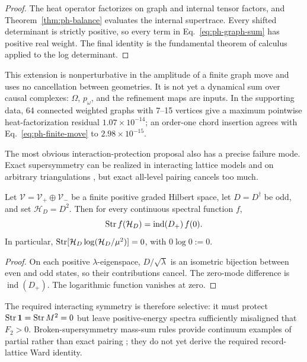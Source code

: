 \begin{proof}
The heat operator factorizes on graph and internal tensor factors, and
Theorem~\ref{thm:ph-balance} evaluates the internal supertrace.  Every
shifted determinant is strictly positive, so every term in
Eq.~\eqref{eq:ph-graph-sum} has positive real weight.  The final identity
is the fundamental theorem of calculus applied to the log determinant.
\end{proof}

This extension is nonperturbative in the amplitude of a finite graph move
and uses no cancellation between geometries.  It is not yet a dynamical
sum over causal complexes: \(\Omega\), \(p_\omega\), and the refinement maps
are inputs.  In the supporting data, 64 connected weighted graphs with
7--15 vertices give a maximum pointwise heat-factorization residual
\(1.07\times10^{-14}\); an order-one chord insertion agrees with
Eq.~\eqref{eq:ph-finite-move} to \(2.98\times10^{-15}\).

The most obvious interaction-protection proposal also has a precise
failure mode.  Exact supersymmetry can be realized in interacting lattice
models and on arbitrary triangulations
\cite{CatterallKaramov2002,BerensteinCatterall2025}, but exact all-level
pairing cancels too much.

\begin{theorem}
\label{thm:ph-pairing-obstruction}
Let \(\mathcal V=\mathcal V_+\oplus\mathcal V_-\) be a finite positive
graded Hilbert space, let \(D=D^\dagger\) be odd, and set
\(\mathcal H_D=D^2\).  Then for every continuous spectral function \(f\),
\begin{equation}
 \operatorname{Str} f(\mathcal H_D)=\operatorname{ind}(D_+)\,f(0).
 \label{eq:ph-pairing-index}
\end{equation}
In particular,
\(\operatorname{Str}[\mathcal H_D\log(\mathcal H_D/\mu^2)]=0\), with
\(0\log0:=0\).
\end{theorem}

\begin{proof}
On each positive \(\lambda\)-eigenspace,
\(D/\sqrt{\lambda}\) is an isometric bijection between even and odd
states, so their contributions cancel.  The zero-mode difference is
\(\operatorname{ind}(D_+)\).  The logarithmic function vanishes at zero.
\end{proof}

The required interacting symmetry is therefore selective: it must protect
\(\operatorname{Str}\mathbf1=\operatorname{Str} M^2=0\) but leave positive-energy spectra sufficiently
misaligned that \(F_2>0\).  Broken-supersymmetry mass-sum rules provide
continuum examples of partial rather than exact pairing
\cite{ItoyamaMaru2015,BenaEtAl2016}; they do not yet derive the required
record-lattice Ward identity.

